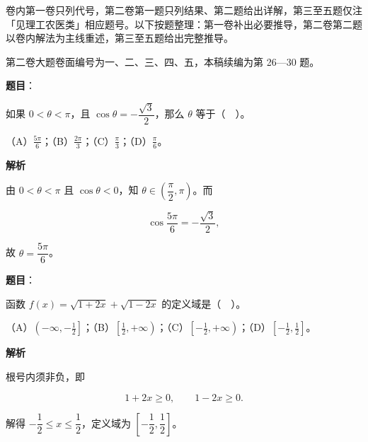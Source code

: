 

卷内第一卷只列代号，第二卷第一题只列结果、第二题给出详解，第三至五题仅注「见理工农医类」相应题号。以下按题整理：第一卷补出必要推导，第二卷第二题以卷内解法为主线重述，第三至五题给出完整推导。

第二卷大题卷面编号为一、二、三、四、五，本稿续编为第 26—30 题。


\begin{answer}

\textbf{题目}：

如果 $0<\theta<\pi$，且 $\cos\theta=-\dfrac{\sqrt3}{2}$，那么 $\theta$ 等于（　）。

（A）$\frac{5\pi}{6}$；（B）$\frac{2\pi}{3}$；（C）$\frac{\pi}{3}$；（D）$\frac{\pi}{6}$。

\textbf{解析}

由 $0<\theta<\pi$ 且 $\cos\theta<0$，知 $\theta\in\left(\dfrac{\pi}{2},\pi\right)$。而

\nopagebreak[4]
\[
\cos\frac{5\pi}{6}=-\frac{\sqrt3}{2},
\]

故 $\theta=\dfrac{5\pi}{6}$。


\end{answer}
\begin{answer}

\textbf{题目}：

函数 $f(x)=\sqrt{1+2x}+\sqrt{1-2x}$ 的定义域是（　）。

（A）$\left(-\infty,-\frac12\right]$；（B）$\left[\frac12,+\infty\right)$；（C）$\left[-\frac12,+\infty\right)$；（D）$\left[-\frac12,\frac12\right]$。

\textbf{解析}

根号内须非负，即

\nopagebreak[4]
\[
1+2x\ge 0,\qquad 1-2x\ge 0.
\]

解得 $-\dfrac12\le x\le\dfrac12$，定义域为 $\left[-\dfrac12,\dfrac12\right]$。


\end{answer}
